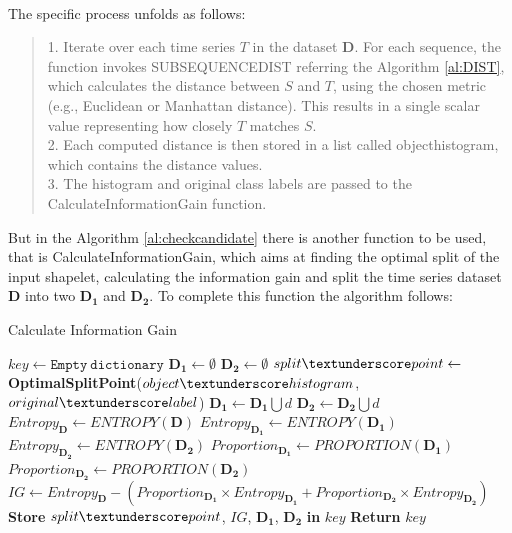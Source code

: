 \\
The specific process unfolds as follows:
\begin{quote}
1. Iterate over each time series $T$ in the dataset $\boldsymbol{D}$. For each sequence, the function invokes SUBSEQUENCEDIST referring the Algorithm \ref{al:DIST}, which calculates the distance between $S$ and $T$, using the chosen metric (e.g., Euclidean or Manhattan distance). This results in a single scalar value representing how closely $T$ matches $S$.\\
2. Each computed distance is then stored in a list called object\textunderscore histogram, which contains the distance values. \\
3. The histogram and original class labels are passed to the CalculateInformationGain function.
\end{quote}

\noindent But in the Algorithm \ref{al:checkcandidate} there is another function to be used, that is CalculateInformationGain, which aims at finding the optimal split of the input shapelet, calculating the information gain and split the time series dataset $\boldsymbol{D}$ into two $\boldsymbol{D_1}$ and $\boldsymbol{D_2}$. To complete this function the algorithm follows:
\begin{algorithm}[H]
	\caption{Calculate Information Gain}
	\begin{algorithmic}[1]{
			\State $key \gets \mathtt{Empty\ dictionary}$
			\State $\boldsymbol{D_1} \gets \emptyset$
			\State $\boldsymbol{D_2} \gets \emptyset$
			\State $split\textunderscore 	point \gets$ \textbf{OptimalSplitPoint}($object\textunderscore histogram$, $original\textunderscore label$)
			\State $\boldsymbol{D_1} \gets \boldsymbol{D_1} \bigcup d$ 
			\Else $\boldsymbol{D_2} \gets \boldsymbol{D_2} \bigcup d$ 
			\EndIf
			\EndFor	
			\State $Entropy_{\boldsymbol{D}} \gets ENTROPY(\boldsymbol{D})$
			\State $Entropy_{\boldsymbol{D_1}} \gets ENTROPY(\boldsymbol{D_1})$
			\State $Entropy_{\boldsymbol{D_2}} \gets ENTROPY(\boldsymbol{D_2})$
			\State $Proportion_{\boldsymbol{D_1}} \gets PROPORTION(\boldsymbol{D_1})$
			\State $Proportion_{\boldsymbol{D_2}} \gets PROPORTION(\boldsymbol{D_2})$
			\State $IG \gets Entropy_{\boldsymbol{D}}-(Proportion_{\boldsymbol{D_1}} \times Entropy_{\boldsymbol{D_1}}+Proportion_{\boldsymbol{D_2}} \times Entropy_{\boldsymbol{D_2}})$
			\State \textbf{Store} $split\textunderscore point$, $IG$, $\boldsymbol{D_1}$, $\boldsymbol{D_2}$ \textbf{in} $key$
			\State \textbf{Return} $key$
			\EndProcedure
		}
	\end{algorithmic}
	\label{al:CIG}
\end{algorithm}

